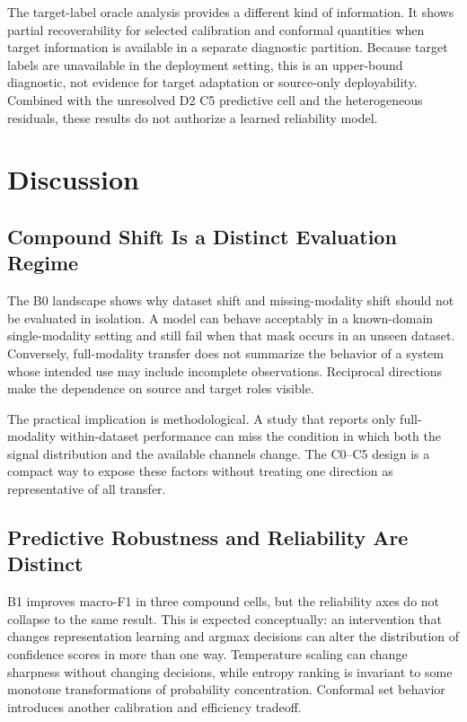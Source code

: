 \documentclass[10pt,twocolumn]{article}
\begin{document}
The target-label oracle analysis provides a different kind of information. It shows partial recoverability for selected calibration and conformal quantities when target information is available in a separate diagnostic partition. Because target labels are unavailable in the deployment setting, this is an upper-bound diagnostic, not evidence for target adaptation or source-only deployability. Combined with the unresolved D2 C5 predictive cell and the heterogeneous residuals, these results do not authorize a learned reliability model.

\section{Discussion}
\subsection{Compound Shift Is a Distinct Evaluation Regime}
The B0 landscape shows why dataset shift and missing-modality shift should not be evaluated in isolation. A model can behave acceptably in a known-domain single-modality setting and still fail when that mask occurs in an unseen dataset. Conversely, full-modality transfer does not summarize the behavior of a system whose intended use may include incomplete observations. Reciprocal directions make the dependence on source and target roles visible.

The practical implication is methodological. A study that reports only full-modality within-dataset performance can miss the condition in which both the signal distribution and the available channels change. The C0--C5 design is a compact way to expose these factors without treating one direction as representative of all transfer.

\subsection{Predictive Robustness and Reliability Are Distinct}
B1 improves macro-F1 in three compound cells, but the reliability axes do not collapse to the same result. This is expected conceptually: an intervention that changes representation learning and argmax decisions can alter the distribution of confidence scores in more than one way. Temperature scaling can change sharpness without changing decisions, while entropy ranking is invariant to some monotone transformations of probability concentration. Conformal set behavior introduces another calibration and efficiency tradeoff.
\end{document}
